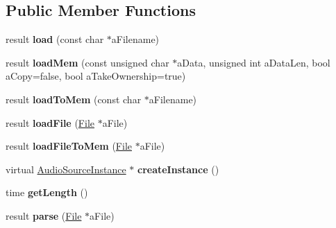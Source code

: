 \subsection*{Public Member Functions}
\begin{DoxyCompactItemize}
\item 
\mbox{\label{class_so_loud_1_1_wav_stream_a773cedad6f1633b4eb82594147964ca1}} 
result {\bfseries load} (const char $\ast$a\+Filename)
\item 
\mbox{\label{class_so_loud_1_1_wav_stream_abb5d80e6937e2b591f3c7fbd5f7f04d6}} 
result {\bfseries load\+Mem} (const unsigned char $\ast$a\+Data, unsigned int a\+Data\+Len, bool a\+Copy=false, bool a\+Take\+Ownership=true)
\item 
\mbox{\label{class_so_loud_1_1_wav_stream_a03f942b0777845f796a72164bdd88f24}} 
result {\bfseries load\+To\+Mem} (const char $\ast$a\+Filename)
\item 
\mbox{\label{class_so_loud_1_1_wav_stream_a82ed0d1c2d46674af996dacda3476f14}} 
result {\bfseries load\+File} (\mbox{\hyperlink{class_so_loud_1_1_file}{File}} $\ast$a\+File)
\item 
\mbox{\label{class_so_loud_1_1_wav_stream_a4ae9a4f93ae01b753be32723fd3ebd8a}} 
result {\bfseries load\+File\+To\+Mem} (\mbox{\hyperlink{class_so_loud_1_1_file}{File}} $\ast$a\+File)
\item 
\mbox{\label{class_so_loud_1_1_wav_stream_a0ecbcaeaac35da2c66fe66fd70049df1}} 
virtual \mbox{\hyperlink{class_so_loud_1_1_audio_source_instance}{Audio\+Source\+Instance}} $\ast$ {\bfseries create\+Instance} ()
\item 
\mbox{\label{class_so_loud_1_1_wav_stream_a9a2eef451318d5cb65428cc780d87138}} 
time {\bfseries get\+Length} ()
\item 
\mbox{\label{class_so_loud_1_1_wav_stream_a51f8c2a96dc01eec1c614a0a4a165bdf}} 
result {\bfseries parse} (\mbox{\hyperlink{class_so_loud_1_1_file}{File}} $\ast$a\+File)
\end{DoxyCompactItemize}
